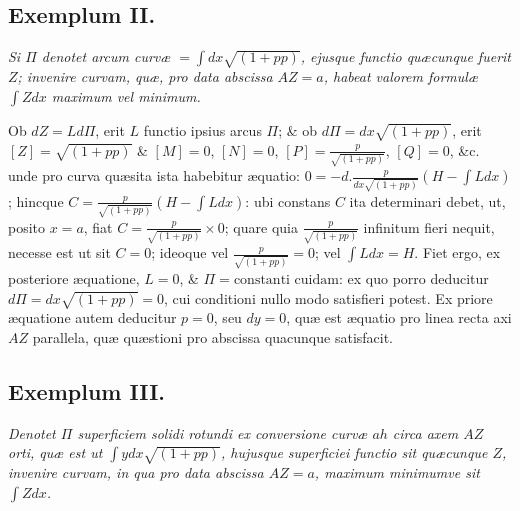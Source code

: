 \subsection*{Exemplum II.}
\textit{Si $\Pi$ denotet arcum curvæ $=\int dx\sqrt{(1+pp)}$, ejusque functio quæcunque fuerit $Z$; invenire curvam, quæ, pro data abscissa $AZ=a$, habeat valorem formulæ $\int Zdx$ maximum vel minimum.}

Ob $dZ=Ld\Pi$, erit $L$ functio ipsius arcus $\Pi$; \& ob $d\Pi=dx\sqrt{(1+pp)}$, erit $[Z]=\sqrt{(1+pp)}$ \& $[M]=0$, $[N]=0$, $[P]=\frac p{\sqrt{(1+pp)}}$, $[Q]=0$, \&c. unde pro curva quæsita ista habebitur æquatio: $0=-d.\frac p{dx\sqrt{(1+pp)}}(H-\int Ldx)$; hincque $C=\frac p{\sqrt{(1+pp)}}(H-\int Ldx)$: ubi constans $C$ ita determinari debet, ut, posito $x=a$, fiat $C=\frac p{\sqrt{(1+pp)}}\times0$; quare quia $\frac p{\sqrt{(1+pp)}}$ infinitum fieri nequit, necesse est ut sit $C=0$; ideoque vel $\frac p{\sqrt{(1+pp)}}=0$; vel $\int Ldx=H$. Fiet ergo, ex posteriore æquatione, $L=0$, \& $\Pi=\text{constanti cuidam}$: ex quo porro deducitur $d\Pi=dx\sqrt{(1+pp)}=0$, cui conditioni nullo modo satisfieri potest. Ex priore æquatione autem deducitur $p=0$, seu $dy=0$, quæ est æquatio pro linea recta axi $AZ$ parallela, quæ quæstioni pro abscissa quacunque satisfacit.
\subsection*{Exemplum III.}
\textit{Denotet $\Pi$ superficiem solidi rotundi ex conversione curvæ $ah$ circa axem $AZ$ orti, quæ est ut $\int ydx\sqrt{(1+pp)}$, hujusque superficiei functio sit quæcunque $Z$, invenire curvam, in qua pro data abscissa $AZ=a$, maximum minimumve sit $\int Zdx$.}

